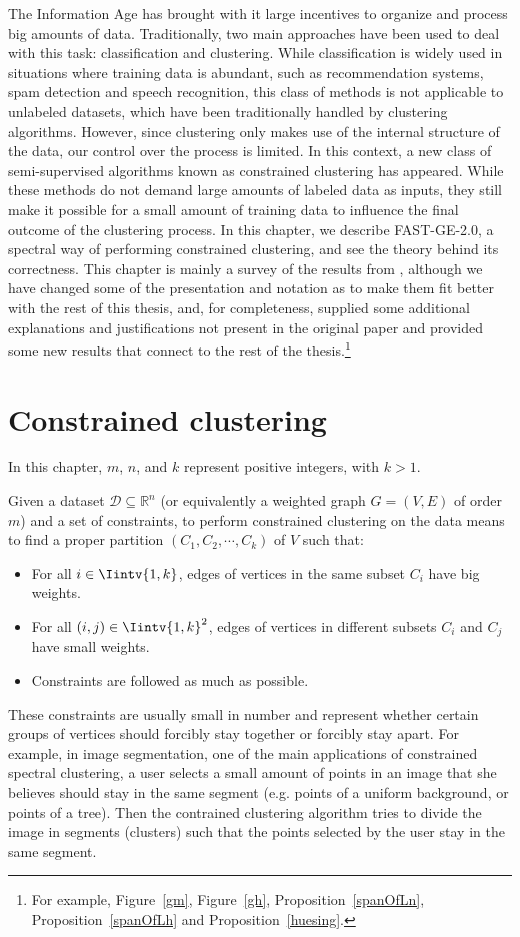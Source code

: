 The Information Age has brought with it large incentives to organize and process big amounts of data.
Traditionally, two main approaches have been used to deal with this task: classification and clustering.
While classification is widely used in situations where training data is abundant, such as recommendation systems, spam detection and speech recognition, this class of methods is not applicable to unlabeled datasets, which have been traditionally handled by clustering algorithms.
However, since clustering only makes use of the internal structure of the data, our control over the process is limited.
In this context, a new class of semi-supervised algorithms known as constrained clustering has appeared.
While these methods do not demand large amounts of labeled data as inputs, they still make it possible for a small amount of training data to influence the final outcome of the clustering process.
In this chapter, we describe FAST-GE-2.0, a spectral way of performing constrained clustering, and see the theory behind its correctness.
This chapter is mainly a survey of the results from \cite{fastge2}, although we have changed some of the presentation and notation as to make them fit better with the rest of this thesis, and, for completeness, supplied some additional explanations and justifications not present in the original paper and provided some new results that connect to the rest of the thesis.\footnote{For example, Figure~\vref{gm}, Figure~\vref{gh}, Proposition~\vref{spanOfLn}, Proposition~\vref{spanOfLh} and Proposition~\vref{huesing}.}

\section{Constrained clustering}
In this chapter, $m$, $n$, and $k$ represent positive integers, with $k > 1$.

Given a dataset $\mathcal D \subseteq \mathbb{R}^{n }$ (or equivalently a weighted graph $G = (V,E)$ of order $m$) and a set of constraints, to perform constrained clustering on the data means to find a proper partition $(C_1, C_2, \cdots, C_k)$ of $V$ such that:
\begin{itemize}
   \item For all $i \in \Iintv{1,k}$, edges of vertices in the same subset $C_i$ have big weights.
   \item For all $(i,j) \in \Iintv{1,k}^2$, edges of vertices in different subsets $C_i$ and $C_j$ have small weights.
   \item Constraints are followed as much as possible.
\end{itemize}
These constraints are usually small in number and represent whether certain groups of vertices should forcibly stay together or forcibly stay apart.
For example, in image segmentation, one of the main applications of constrained spectral clustering, a user selects a small amount of points in an image that she believes should stay in the same segment (e.g. points of a uniform background, or points of a tree). Then the contrained clustering algorithm tries to divide the image in segments (clusters) such that the points selected by the user stay in the same segment.


